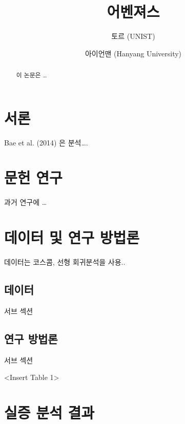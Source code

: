 \documentclass[12pt,]{article}
\title{어벤져스}
\author{토르 (UNIST) \and 아이언맨 (Hanyang University)}
\date{}
\begin{document}
\maketitle
\begin{abstract}
이 논문은 \ldots{}
\end{abstract}

\setlength{\parindent}{1cm}

\hypertarget{uxc11cuxb860}{%
\section{서론}\label{uxc11cuxb860}}

Bae et al. (2014) 은 분석\ldots{}.

\hypertarget{uxbb38uxd5cc-uxc5f0uxad6c}{%
\section{문헌 연구}\label{uxbb38uxd5cc-uxc5f0uxad6c}}

과거 연구에 \ldots{}

\hypertarget{uxb370uxc774uxd130-uxbc0f-uxc5f0uxad6c-uxbc29uxbc95uxb860}{%
\section{데이터 및 연구
방법론}\label{uxb370uxc774uxd130-uxbc0f-uxc5f0uxad6c-uxbc29uxbc95uxb860}}

데이터는 코스콤, 선형 회귀분석을 사용..

\hypertarget{uxb370uxc774uxd130}{%
\subsection{데이터}\label{uxb370uxc774uxd130}}

서브 섹션

\hypertarget{uxc5f0uxad6c-uxbc29uxbc95uxb860}{%
\subsection{연구 방법론}\label{uxc5f0uxad6c-uxbc29uxbc95uxb860}}

서브 섹션

\begin{center}
<Insert Table 1>
\end{center}

\hypertarget{uxc2e4uxc99d-uxbd84uxc11d-uxacb0uxacfc}{%
\section{실증 분석 결과}\label{uxc2e4uxc99d-uxbd84uxc11d-uxacb0uxacfc}}
\end{document}
